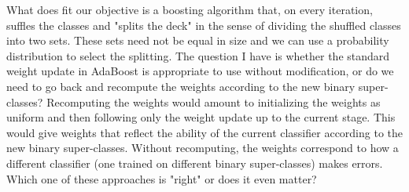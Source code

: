 \documentclass{article}
\begin{document}
What does fit our objective is a boosting algorithm that, on every iteration, suffles the classes and "splits the deck" in the sense of dividing the shuffled classes into two sets.  These sets need not be equal in size and we can use a probability distribution to select the splitting.  The question I have is whether the standard weight update in AdaBoost is appropriate to use without modification, or do we need to go back and recompute the weights according to the new binary super-classes?  Recomputing the weights would amount to initializing the weights as uniform and then following only the weight update up to the current stage.  This would give weights that reflect the ability of the current classifier according to the new binary super-classes.  Without recomputing, the weights correspond to how a different classifier (one trained on different binary super-classes) makes errors.  Which one of these approaches is "right" or does it even matter?

{}

\end{document}
